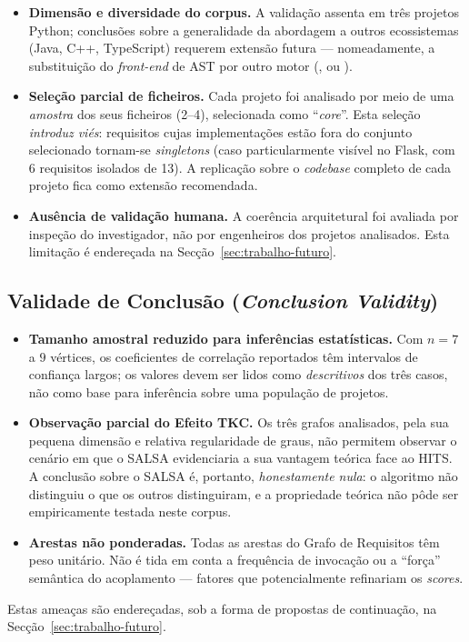 \begin{itemize}
    \item \textbf{Dimensão e diversidade do corpus.} A validação
        assenta em três projetos Python; conclusões sobre a
        generalidade da abordagem a outros ecossistemas (Java, C++,
        TypeScript) requerem extensão futura --- nomeadamente, a
        substituição do \emph{front-end} de AST por outro motor
        (,  ou
        ).

    \item \textbf{Seleção parcial de ficheiros.} Cada projeto foi
        analisado por meio de uma \emph{amostra} dos seus ficheiros
        (2--4), selecionada como ``\emph{core}''. Esta seleção
        \emph{introduz viés}: requisitos cujas implementações estão
        fora do conjunto selecionado tornam-se \emph{singletons}
        (caso particularmente visível no Flask, com 6 requisitos
        isolados de 13). A replicação sobre o \emph{codebase}
        completo de cada projeto fica como extensão recomendada.

    \item \textbf{Ausência de validação humana.} A coerência
        arquitetural foi avaliada por inspeção do investigador, não
        por engenheiros dos projetos analisados. Esta limitação é
        endereçada na Secção~\ref{sec:trabalho-futuro}.
\end{itemize}

\subsection{Validade de Conclusão (\emph{Conclusion Validity})}

\begin{itemize}
    \item \textbf{Tamanho amostral reduzido para inferências
        estatísticas.} Com $n = 7$ a $9$ vértices, os coeficientes de
        correlação reportados têm intervalos de confiança largos;
        os valores devem ser lidos como \emph{descritivos} dos três
        casos, não como base para inferência sobre uma população de
        projetos.

    \item \textbf{Observação parcial do Efeito TKC.} Os três grafos
        analisados, pela sua pequena dimensão e relativa
        regularidade de graus, não permitem observar o cenário em
        que o SALSA evidenciaria a sua vantagem teórica face ao
        HITS. A conclusão sobre o SALSA é, portanto,
        \emph{honestamente nula}: o algoritmo não distinguiu o que
        os outros distinguiram, e a propriedade teórica não pôde ser
        empiricamente testada neste corpus.

    \item \textbf{Arestas não ponderadas.} Todas as arestas do Grafo
        de Requisitos têm peso unitário. Não é tida em conta a
        frequência de invocação ou a ``força'' semântica do
        acoplamento --- fatores que potencialmente refinariam os
        \emph{scores}.
\end{itemize}

Estas ameaças são endereçadas, sob a forma de propostas de
continuação, na Secção~\ref{sec:trabalho-futuro}.
